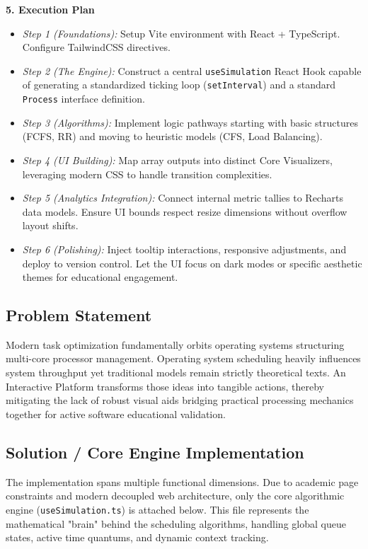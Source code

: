 \documentclass[a4paper]{article}
\begin{document}
\textbf{5. Execution Plan}
\begin{itemize}[noitemsep]
    \item \textit{Step 1 (Foundations):} Setup Vite environment with React + TypeScript. Configure TailwindCSS directives. 
    \item \textit{Step 2 (The Engine):} Construct a central \texttt{useSimulation} React Hook capable of generating a standardized ticking loop (\texttt{setInterval}) and a standard \texttt{Process} interface definition.
    \item \textit{Step 3 (Algorithms):} Implement logic pathways starting with basic structures (FCFS, RR) and moving to heuristic models (CFS, Load Balancing).
    \item \textit{Step 4 (UI Building):} Map array outputs into distinct Core Visualizers, leveraging modern CSS to handle transition complexities.
    \item \textit{Step 5 (Analytics Integration):} Connect internal metric tallies to Recharts data models. Ensure UI bounds respect resize dimensions without overflow layout shifts.
    \item \textit{Step 6 (Polishing):} Inject tooltip interactions, responsive adjustments, and deploy to version control. Let the UI focus on dark modes or specific aesthetic themes for educational engagement.
\end{itemize}

\subsection{Problem Statement}
Modern task optimization fundamentally orbits operating systems structuring multi-core processor management. Operating system scheduling heavily influences system throughput yet traditional models remain strictly theoretical texts. An Interactive Platform transforms those ideas into tangible actions, thereby mitigating the lack of robust visual aids bridging practical processing mechanics together for active software educational validation.

\subsection{Solution / Core Engine Implementation}
The implementation spans multiple functional dimensions. Due to academic page constraints and modern decoupled web architecture, only the core algorithmic engine (\texttt{useSimulation.ts}) is attached below. This file represents the mathematical "brain" behind the scheduling algorithms, handling global queue states, active time quantums, and dynamic context tracking.
\end{document}
